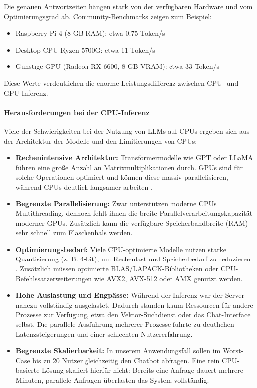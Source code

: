Die genauen Antwortzeiten hängen stark von der verfügbaren Hardware und vom Optimierungsgrad ab.
Community-Benchmarks zeigen zum Beispiel:

\begin{itemize}
    \item Raspberry Pi 4 (8 GB RAM): etwa 0.75 Token/s \cite{gguf_hardware_specs}
    \item Desktop-CPU Ryzen 5700G: etwa 11 Token/s \cite{gguf_hardware_specs}
    \item Günstige GPU (Radeon RX 6600, 8 GB VRAM): etwa 33 Token/s \cite{gguf_hardware_specs}
\end{itemize}

Diese Werte verdeutlichen die enorme Leistungsdifferenz zwischen CPU- und GPU-Inferenz.

\paragraph{Herausforderungen bei der CPU-Inferenz}

Viele der Schwierigkeiten bei der Nutzung von LLMs auf CPUs ergeben sich aus der Architektur der Modelle und den Limitierungen von CPUs:

\begin{itemize}
    \item \textbf{Rechenintensive Architektur:} Transformermodelle wie GPT oder LLaMA führen eine große Anzahl an Matrixmultiplikationen durch. GPUs sind für solche Operationen optimiert und können diese massiv parallelisieren, während CPUs deutlich langsamer arbeiten \cite{cpu_vs_gpu_transformer}.

    \item \textbf{Begrenzte Parallelisierung:} Zwar unterstützen moderne CPUs Multithreading, dennoch fehlt ihnen die breite Parallelverarbeitungskapazität moderner GPUs. Zusätzlich kann die verfügbare Speicherbandbreite (RAM) sehr schnell zum Flaschenhals werden.

    \item \textbf{Optimierungsbedarf:} Viele CPU-optimierte Modelle nutzen starke Quantisierung (z. B. 4-bit), um Rechenlast und Speicherbedarf zu reduzieren \cite{cpu_reasoning_langchain}. Zusätzlich müssen optimierte BLAS/LAPACK-Bibliotheken oder CPU-Befehlssatzerweiterungen wie AVX2, AVX-512 oder AMX genutzt werden.

    \item \textbf{Hohe Auslastung und Engpässe:} Während der Inferenz war der Server nahezu vollständig ausgelastet. Dadurch standen kaum Ressourcen für andere Prozesse zur Verfügung, etwa den Vektor-Suchdienst oder das Chat-Interface selbst. Die parallele Ausführung mehrerer Prozesse führte zu deutlichen Latenzsteigerungen und einer schlechten Nutzererfahrung.

    \item \textbf{Begrenzte Skalierbarkeit:} In unserem Anwendungsfall sollen im Worst-Case bis zu 20 Nutzer gleichzeitig den Chatbot abfragen. Eine rein CPU-basierte Lösung skaliert hierfür nicht: Bereits eine Anfrage dauert mehrere Minuten, parallele Anfragen überlasten das System vollständig.
\end{itemize}

